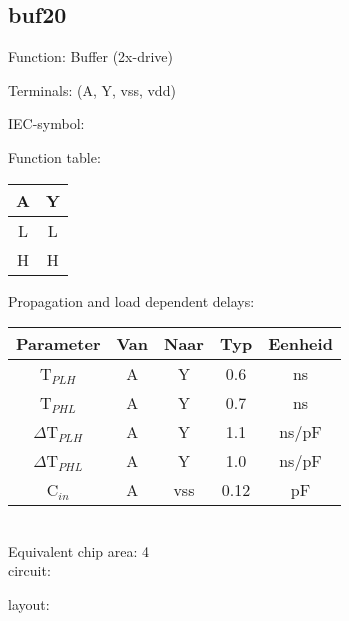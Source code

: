 \subsection{buf20}
Function: Buffer (2x-drive)

Terminals: (A, Y, vss, vdd)

\begin{minipage}[t]{0.4\textwidth}
IEC-symbol:\\

\end{minipage} \hfill
\begin{minipage}[t]{0.4\textwidth}
Function table:\\

\begin{tabular}{|c||c|}
\hline
A	&Y\\
\hline
L	&L\\
H	&H\\
\hline
\end{tabular}
\end{minipage}
\vspace{1cm}
\begin{minipage}[b]{0.45\textwidth}
Propagation and load dependent delays:\\

\begin{tabular}{|c|c|c|c|c|}
\hline
Parameter               &Van            &Naar   &Typ    &Eenheid\\
\hline
T$_{PLH}$               &A     		&Y      &0.6    &ns\\
T$_{PHL}$               &A    		&Y      &0.7    &ns\\
\hline
$\Delta$T$_{PLH}$       &A           	&Y      &1.1    &ns/pF\\
$\Delta$T$_{PHL}$       &A           	&Y      &1.0    &ns/pF\\
\hline
C$_{in}$                &A	    	&vss    &0.12   &pF\\
\hline
\end{tabular}\\

Equivalent chip area: 4\\

circuit:\\

\end{minipage} \hfill
\begin{minipage}[b]{0.35\textwidth}
layout:\\
\end{minipage}
\clearpage
